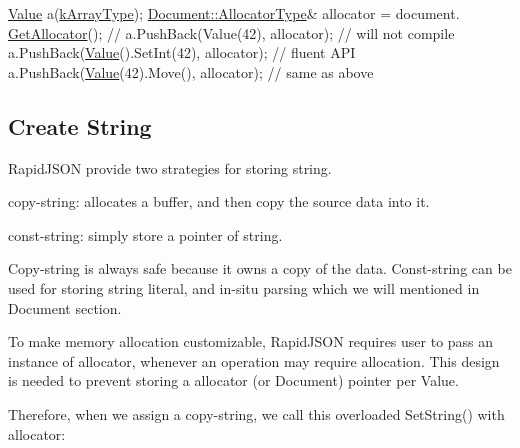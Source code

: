 \begin{DoxyCode}
\hyperlink{class_generic_value}{Value} a(\hyperlink{rapidjson_8h_a1d1cfd8ffb84e947f82999c682b666a7af41527d6925efa3c5c3dadb23dfef7c8}{kArrayType});
\hyperlink{class_generic_document_a35155b912da66ced38d22e2551364c57}{Document::AllocatorType}& allocator = document.
      \hyperlink{class_generic_document_aa4609d6b19f86aec1a6b96edf2c27686}{GetAllocator}();
\textcolor{comment}{// a.PushBack(Value(42), allocator);       // will not compile}
a.PushBack(\hyperlink{document_8h_a071cf97155ba72ac9a1fc4ad7e63d481}{Value}().SetInt(42), allocator); \textcolor{comment}{// fluent API}
a.PushBack(\hyperlink{document_8h_a071cf97155ba72ac9a1fc4ad7e63d481}{Value}(42).Move(), allocator);   \textcolor{comment}{// same as above}
\end{DoxyCode}
\hypertarget{md_Commun_Externe_RapidJSON_doc_tutorial.zh-cn_CreateString}{}\subsection{Create String}\label{md_Commun_Externe_RapidJSON_doc_tutorial.zh-cn_CreateString}
Rapid\+J\+S\+ON provide two strategies for storing string.


\begin{DoxyEnumerate}
\item copy-\/string\+: allocates a buffer, and then copy the source data into it.
\item const-\/string\+: simply store a pointer of string.
\end{DoxyEnumerate}

Copy-\/string is always safe because it owns a copy of the data. Const-\/string can be used for storing string literal, and in-\/situ parsing which we will mentioned in Document section.

To make memory allocation customizable, Rapid\+J\+S\+ON requires user to pass an instance of allocator, whenever an operation may require allocation. This design is needed to prevent storing a allocator (or Document) pointer per Value.

Therefore, when we assign a copy-\/string, we call this overloaded {\ttfamily Set\+String()} with allocator\+:




